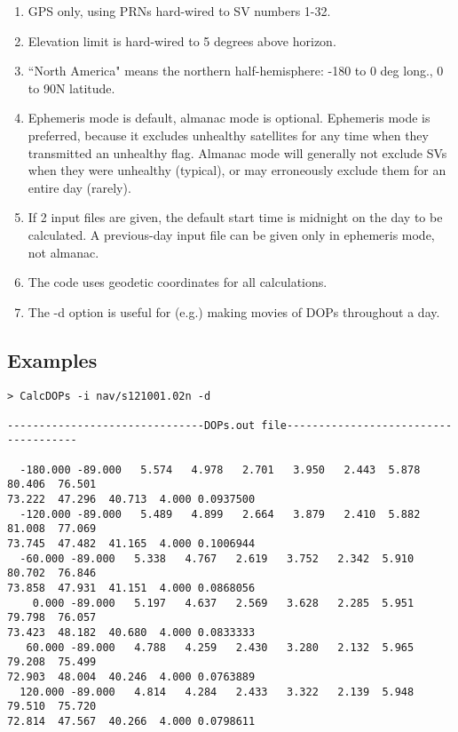 \begin{enumerate}
\item GPS only, using PRNs hard-wired to SV numbers 1-32.
\item Elevation limit is hard-wired to 5 degrees above horizon.
\item ``North America" means the northern half-hemisphere: -180 to 0 deg long.,
      0 to 90N latitude.
\item Ephemeris mode is default, almanac mode is optional.  Ephemeris mode is
      preferred, because it excludes unhealthy satellites for any time when they
      transmitted an unhealthy flag.  Almanac mode will generally not exclude SVs
      when they were unhealthy (typical), or may erroneously exclude them for an
      entire day (rarely).
\item If 2 input files are given, the default start time is midnight on the day
      to be calculated.  A previous-day input file can be given only in ephemeris
      mode, not almanac.
\item The code uses geodetic coordinates for all calculations.
\item The -d option is useful for (e.g.) making movies of DOPs throughout a day.
\end{enumerate}

\subsection{Examples}
\begin{verbatim}
> CalcDOPs -i nav/s121001.02n -d

-------------------------------DOPs.out file-------------------------------------

  -180.000 -89.000   5.574   4.978   2.701   3.950   2.443  5.878  80.406  76.501  
73.222  47.296  40.713  4.000 0.0937500 
  -120.000 -89.000   5.489   4.899   2.664   3.879   2.410  5.882  81.008  77.069  
73.745  47.482  41.165  4.000 0.1006944 
  -60.000 -89.000   5.338   4.767   2.619   3.752   2.342  5.910  80.702  76.846  
73.858  47.931  41.151  4.000 0.0868056 
    0.000 -89.000   5.197   4.637   2.569   3.628   2.285  5.951  79.798  76.057  
73.423  48.182  40.680  4.000 0.0833333 
   60.000 -89.000   4.788   4.259   2.430   3.280   2.132  5.965  79.208  75.499  
72.903  48.004  40.246  4.000 0.0763889 
  120.000 -89.000   4.814   4.284   2.433   3.322   2.139  5.948  79.510  75.720  
72.814  47.567  40.266  4.000 0.0798611 

\end{verbatim}

%

